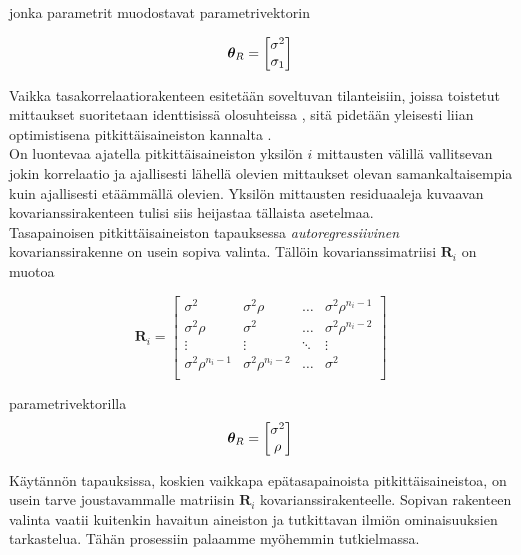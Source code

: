 \documentclass[finnish]{docopts}
\begin{document}
jonka parametrit muodostavat parametrivektorin

$$
\bm{\theta}_R =
\begin{bmatrix}
\sigma^2\\
\sigma_1 \\
\end{bmatrix}\\
$$

Vaikka tasakorrelaatiorakenteen esitetään soveltuvan tilanteisiin, joissa toistetut mittaukset suoritetaan identtisissä olosuhteissa \cite{pinheiro00, west14}, sitä pidetään yleisesti liian optimistisena pitkittäisaineiston kannalta \cite{pinheiro00, fitzmaurice11, west14}.\\

On luontevaa ajatella pitkittäisaineiston yksilön $i$ mittausten välillä vallitsevan jokin korrelaatio ja ajallisesti lähellä olevien mittaukset olevan samankaltaisempia kuin ajallisesti etäämmällä olevien. Yksilön mittausten residuaaleja kuvaavan kovarianssirakenteen tulisi siis heijastaa tällaista asetelmaa.\\

Tasapainoisen pitkittäisaineiston tapauksessa \textit{autoregressiivinen} kovarianssirakenne on usein sopiva valinta. Tällöin kovarianssimatriisi $\bm{R}_i$ on muotoa

$$
\bm{R}_i =
\begin{bmatrix}
\sigma^2 & \sigma^2 \rho & \dots  & \sigma^2 \rho^{n_i -1} \\
\sigma^2 \rho   & \sigma^2      & \dots & \sigma^2 \rho^{n_i -2} \\
\vdots   & \vdots        & \ddots & \vdots \\
\sigma^2 \rho^{n_i -1} & \sigma^2 \rho^{n_i -2} & \dots & \sigma^2 \\
\end{bmatrix}
$$

parametrivektorilla \\

$$
\bm{\theta}_R =
\begin{bmatrix}
\sigma^2\\
\rho \\
\end{bmatrix}\\
$$

Käytännön tapauksissa, koskien vaikkapa epätasapainoista pitkittäisaineistoa, on usein tarve joustavammalle matriisin $\bm{R}_i$ kovarianssirakenteelle. Sopivan rakenteen valinta vaatii kuitenkin havaitun aineiston ja tutkittavan ilmiön ominaisuuksien tarkastelua. Tähän prosessiin palaamme myöhemmin tutkielmassa.\\
\end{document}
